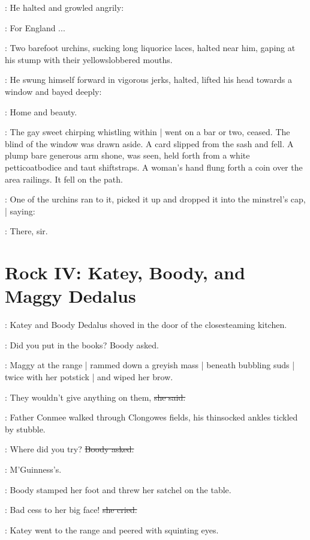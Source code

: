 :
He halted and growled angrily:

\sailor:
For England ...

:
Two barefoot urchins,
sucking long liquorice laces,
halted near him,
gaping at his stump with their yellowslobbered mouths.

:
He swung himself forward in vigorous jerks,
halted,
lifted his head towards a window
and bayed deeply:

\sailor:
Home and beauty.

:
The gay sweet chirping whistling within |
went on a bar or two, ceased.
The blind of the window was drawn aside.
A card 
slipped from the sash and fell.
A plump bare generous arm shone,
was seen,
held forth from a white petticoatbodice and taut shiftstraps.
A woman's hand flung forth a coin
over the area railings.
It fell on the path.

:
One of the urchins ran to it,
picked it up and dropped it into the minstrel's cap, |
saying:

:
There, sir.


\section*{Rock IV: Katey, Boody, and Maggy Dedalus}

:
Katey and Boody Dedalus shoved in the door
of the closesteaming kitchen.

\boody:
Did you put in the books?
Boody asked.

:
Maggy at the range |
rammed down a greyish mass |
beneath bubbling suds |
twice with her potstick |
and wiped her brow.

\maggy:
They wouldn't give anything on them,
\sout{she said.}

\begin{mdframed}
    :
    Father Conmee walked through Clongowes fields,
    his thinsocked ankles tickled by stubble.
\end{mdframed}

\boody:
Where did you try?
\sout{Boody asked.}

\maggy:
M'Guinness's.

:
Boody stamped her foot and threw her satchel on the table.

\boody:
Bad cess to her big face!
\sout{she cried.}

:
Katey went to the range
and peered with squinting eyes.

